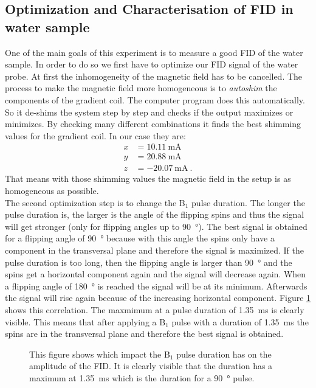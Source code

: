 \subsection{Optimization and Characterisation of FID in water sample}
\label{sec:OptimizationandCharacterisationofFIDinwatersample}

One of the main goals of this experiment is to measure a good FID of the water sample.
In order to do so we first have to optimize our FID signal of the water probe.\newline
At first the inhomogeneity of the magnetic field has to be cancelled.
The process to make the magnetic field more homogeneous is to \textit{autoshim} the components of the gradient coil.
The computer program does this automatically. So it de-shims the system step by step and checks if the output maximizes or minimizes.
By checking many different combinations it finds the best shimming values for the gradient coil.
In our case they are:
\begin{align*}
    x &= \SI{10.11}{\milli \ampere}\\
    y &= \SI{20.88}{\milli \ampere}\\
    z &= \SI{-20.07}{\milli \ampere} \ .
    \label{eq: shimmingvalues}
\end{align*}
That means with those shimming values the magnetic field in the setup is as homogeneous as possible.
\\
The second optimization step is to change the B$_1$ pulse duration.
The longer the pulse duration is, the larger is the angle of the flipping spins and thus the signal will get stronger (only for flipping angles up to \SI{90}{\degree}).
The best signal is obtained for a flipping angle of \SI{90}{\degree} because with this angle the spins only have a component in the transversal plane and therefore the signal is maximized.
If the pulse duration is too long, then the flipping angle is larger than \SI{90}{\degree} and the spins get a horizontal component again and the signal will decrease again.
When a flipping angle of \SI{180}{\degree} is reached the signal will be at its minimum.
Afterwards the signal will rise again because of the increasing horizontal component.
Figure \ref{fig:B1dauer} shows this correlation.
The maxmimum at a pulse duration of \SI{1.35}{\milli \second} is clearly visible.
This means that after applying a B$_1$ pulse with a duration of \SI{1.35}{\milli \second} the spins are in the transversal plane and therefore the best signal is obtained.
\begin{figure}[H]
    \centering
    
    \caption[This figure shows which impact the B$_1$ pulse duration has on the amplitude of the FID.]{This figure shows which impact the B$_1$ pulse duration has on the amplitude of the FID.
    It is clearly visible that the duration has a maximum at \SI{1.35}{\milli \second} which is the duration for a \SI{90}{\degree} pulse.}
    \label{fig:B1dauer}
\end{figure}
